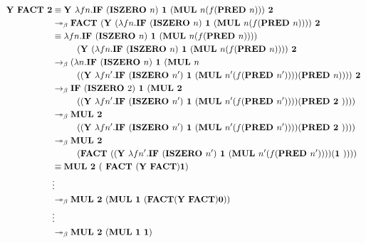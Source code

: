 \begin{align*}
\textbf{Y FACT 2} &\equiv \textbf{Y }\lambda f n. \textbf{IF } (\textbf{ISZERO } n) \textbf{ 1 } (\textbf{MUL } n  (f (\textbf{PRED } n))) \textbf{ 2} \\
&\twoheadrightarrow_{\beta} \textbf{FACT }( \textbf{Y } (\lambda f n. \textbf{IF } (\textbf{ISZERO } n ) \textbf{ 1 } (\textbf{MUL } n (f (\textbf{PRED } n))) ) \textbf{ 2} \\
&\equiv \lambda f n. \textbf{IF } (\textbf{ISZERO } n) \textbf{ 1 } (\textbf{MUL } n  (f (\textbf{PRED } n))) ) \\
	& \hspace{10 mm} ( \textbf{Y } (\lambda f n. \textbf{IF } (\textbf{ISZERO } n ) \textbf{ 1 } (\textbf{MUL } n (f (\textbf{PRED } 	n))) ) \textbf{ 2 }\\
&\rightarrow_{\beta} (\lambda n. \textbf{IF } (\textbf{ISZERO } n) \textbf{ 1 } (\textbf{MUL } n \\
	& \hspace{10 mm} (( \textbf{Y }\lambda f n'. \textbf{IF } (\textbf{ISZERO } n' ) \textbf{ 1 } (\textbf{MUL } n' (f (\textbf{PRED  	} n'))) )  (\textbf{PRED } n))) ) \textbf{ 2 }\\
&\rightarrow_{\beta} \textbf{IF } (\textbf{ISZERO } 2) \textbf{ 1 } (\textbf{MUL 2 } \\
	& \hspace{10 mm} (( \textbf{Y }\lambda f n'. \textbf{IF } (\textbf{ISZERO } n' ) \textbf{ 1 } (\textbf{MUL } n'(f (\textbf{PRED  	} n'))) )  (\textbf{PRED 2 } ))) ) \\
&\twoheadrightarrow_{\beta} \textbf{MUL 2 } \\
	& \hspace{10 mm} (( \textbf{Y }\lambda f n'. \textbf{IF } (\textbf{ISZERO } n' ) \textbf{ 1 } (\textbf{MUL } n' (f (\textbf{PRED  	} n'))) )  (\textbf{PRED 2 }))) )	\\
&\twoheadrightarrow_{\beta} \textbf{MUL 2 } \\
	& \hspace{10 mm} (\textbf{FACT } (( \textbf{Y }\lambda f n'. \textbf{IF } (\textbf{ISZERO } n' ) \textbf{ 1 } (\textbf{MUL } n' (f (\textbf{PRED } n'))) )  (\textbf{1 } ))) ) \\
& \equiv \textbf{MUL 2 } (\textbf{ FACT } ( \textbf{Y FACT} )  \textbf{1}) \\
&\vdots \\
& \twoheadrightarrow_{\beta} \textbf{MUL 2 } (\textbf{MUL 1 } ( \textbf{FACT} (\textbf{Y FACT}) \textbf{0} ) ) \\
&\vdots \\
& \twoheadrightarrow_{\beta} \textbf{MUL 2 } (\textbf{MUL 1 } \textbf{1} )	
\end{align*}


